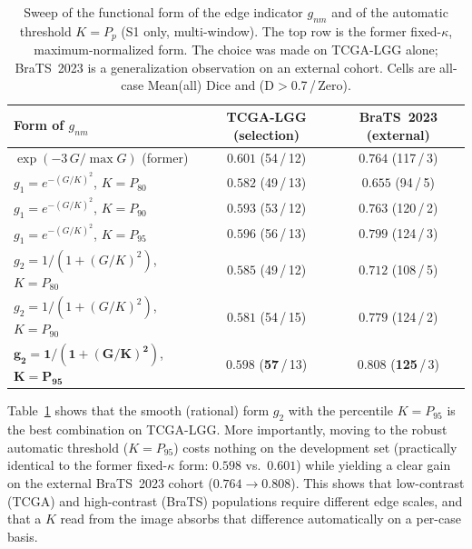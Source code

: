 \documentclass[11pt,a4paper]{article}
\begin{document}
\begin{table}[htpb!]\centering
\caption{Sweep of the functional form of the edge indicator $g_{nm}$ and of the
automatic threshold $K=P_p$ (S1 only, multi-window). The top row is the former
fixed-$\kappa$, maximum-normalized form. The choice was made on TCGA-LGG alone;
BraTS~2023 is a generalization observation on an external cohort. Cells are
all-case Mean(all) Dice and (D$>$0.7\,/\,Zero).}
\label{tab:edgefn}
\begin{tabular}{lcc}
\toprule
Form of $g_{nm}$ & TCGA-LGG (selection) & BraTS~2023 (external) \\
\midrule
$\exp(-3\,G/\max G)$ \;(former) & $0.601$ \;(54\,/\,12) & $0.764$ \;(117\,/\,3) \\
\midrule
$g_1=e^{-(G/K)^2}$, $K{=}P_{80}$ & $0.582$ \;(49\,/\,13) & $0.655$ \;(\phantom{0}94\,/\,5) \\
$g_1=e^{-(G/K)^2}$, $K{=}P_{90}$ & $0.593$ \;(53\,/\,12) & $0.763$ \;(120\,/\,2) \\
$g_1=e^{-(G/K)^2}$, $K{=}P_{95}$ & $0.596$ \;(56\,/\,13) & $0.799$ \;(124\,/\,3) \\
$g_2=1/(1{+}(G/K)^2)$, $K{=}P_{80}$ & $0.585$ \;(49\,/\,12) & $0.712$ \;(108\,/\,5) \\
$g_2=1/(1{+}(G/K)^2)$, $K{=}P_{90}$ & $0.581$ \;(54\,/\,15) & $0.779$ \;(124\,/\,2) \\
$\mathbf{g_2=1/(1{+}(G/K)^2)}$, $\mathbf{K{=}P_{95}}$ & $\mathbf{0.598}$ \;(\textbf{57}\,/\,13) & $\mathbf{0.808}$ \;(\textbf{125}\,/\,3) \\
\bottomrule
\end{tabular}
\end{table}

Table~\ref{tab:edgefn} shows that the smooth (rational) form $g_2$ with the
percentile $K=P_{95}$ is the best combination on TCGA-LGG. More importantly,
moving to the robust automatic threshold ($K=P_{95}$) costs nothing on the
development set (practically identical to the former fixed-$\kappa$ form: $0.598$
vs.\ $0.601$) while yielding a clear gain on the external BraTS~2023 cohort
($0.764 \to 0.808$). This shows that low-contrast (TCGA) and high-contrast (BraTS)
populations require different edge scales, and that a $K$ read from the image
absorbs that difference automatically on a per-case basis.
\end{document}
